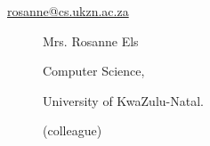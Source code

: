 \documentclass[12pt]{article}
\begin{document}
\begin{multicols}{2}
\begin{description}
\begin{description}
\item[\url{rosanne@cs.ukzn.ac.za}] 
 \item[] Mrs. Rosanne Els
 \item[] Computer Science,
 \item[] University of KwaZulu-Natal.
 \item[]  (colleague) 
\item[]



 \end{description}
\end{description}

\end{multicols}





%
%
%
%
%
%
%
%
%
%
%
\end{document}
